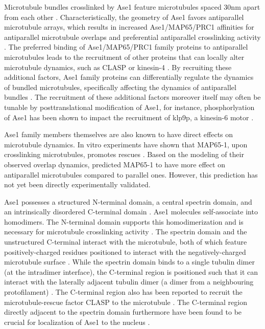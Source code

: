 Microtubule bundles crosslinked by Ase1 feature microtubules spaced 30nm apart from each other . Characteristically, the geometry of Ase1 favors antiparallel microtubule arrays, which results in increased Ase1/MAP65/PRC1 affinities for antiparallel microtubule overlaps and preferential antiparallel crosslinking activity \parencite{She2019,Bieling2010,Janson2007,Subramanian2010,Kellogg2016,Gaillard2008}. The preferred binding of Ase1/MAP65/PRC1 family proteins to antiparallel microtubules leads to the recruitment of other proteins that can locally alter microtubule dynamics, such as CLASP \parencite{Bratman2007b,Liu2009,Kitazawa2014} or kinesin-4 \parencite{Bieling2010, Mani2021}. By recruiting these additional factors, Ase1 family proteins can differentially regulate the dynamics of bundled microtubules, specifically affecting the dynamics of antiparallel bundles \parencite{Bieling2010, Bratman2007b, Thomas2020, Mani2021}. The recruitment of these additional factors moreover itself may often be tunable by posttranslational modification of Ase1, for instance, phosphorlyation of Ase1 has been shown to impact the recruitment of klp9p, a kinesin-6 motor .\par

Ase1 family members themselves are also known to have direct effects on microtubule dynamics. In vitro experiments have shown that MAP65-1, upon crosslinking microtubules, promotes rescues \parencite{Stoppin-Mellet2013}. Based on the modeling of their observed overlap dynamics, \cite{Stoppin-Mellet2013} predicted MAP65-1 to have more effect on antiparallel microtubules compared to parallel ones. However, this prediction has not yet been directly experimentally validated.\par

Ase1 possesses a structured N-terminal domain, a central spectrin domain, and an intrinsically disordered C-terminal domain \parencite{Kapitein2008,Kellogg2016}. Ase1 molecules self-associate into homodimers. The N-terminal domain supports this homodimerization and is necessary for microtubule crosslinking activity \parencite{Janson2007}. The spectrin domain and the unstructured C-terminal interact with the microtubule, both of which feature positively-charged residues positioned to interact with the negatively-charged microtubule surface \parencite{Kellogg2016}. While the spectrin domain binds to a single tubulin dimer (at the intradimer interface), the C-terminal region is positioned such that it can interact with the laterally adjacent tubulin dimer (a dimer from a neighbouring protofilament) \parencite{Kellogg2016}. The C-terminal region also has been reported to recruit the microtubule-rescue factor CLASP to the microtubule \cite{Bratman2007b}. The C-terminal region directly adjacent to the spectrin domain furthermore have been found to be crucial for localization of Ase1 to the nucleus .\par 

